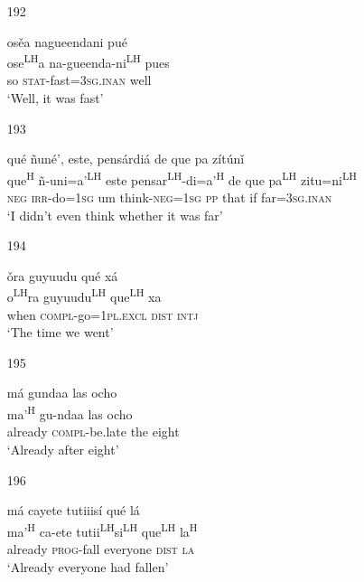 \begin{itemize}
\item[192]
 
\glll   os\v{e}a nagueendani pu\'{e} \\
ose\textsuperscript{LH}a na-gueenda-ni\textsuperscript{LH} pues\\
so \textsc{stat}-fast=\textsc{3sg.inan} well\\
\glt `Well, it was fast'
 


\item[193]
 
\glll   qu\'{e} \~{n}un\'{e}', este, pens\'{a}rdi\'{a} de que pa z\'{i}t\'{u}n\v{i}\\
que\textsuperscript{H} \~{n}-uni=a'\textsuperscript{LH} este pensar\textsuperscript{LH}-di=a'\textsuperscript{H} de que pa\textsuperscript{LH} zitu=ni\textsuperscript{LH}\\
\textsc{neg} \textsc{irr}-do=\textsc{1sg} um think-\textsc{neg}=\textsc{1sg} \textsc{pp} that if far=\textsc{3sg.inan}\\
\glt `I didn't even think whether it was far'
 


\item[194]
 
\glll   \v{o}ra guyuudu qu\'{e} x\'{a} \\
   o\textsuperscript{LH}ra guyuudu\textsuperscript{LH} que\textsuperscript{LH} xa\\
when \textsc{compl}-go=\textsc{1pl.excl} \textsc{dist} \textsc{intj}\\
\glt `The time we went'
 


\item[195]
 
\glll   m\'{a} gundaa las ocho \\
  ma'\textsuperscript{H} gu-ndaa las ocho\\
already \textsc{compl}-be.late the eight\\
\glt `Already after eight'
 


\item[196]
 
\glll   m\'{a} cayete tutiiis\'{i} qu\'{e} l\'{a} \\
ma'\textsuperscript{H} ca-ete tutii\textsuperscript{LH}si\textsuperscript{LH} que\textsuperscript{LH} la\textsuperscript{H}\\
already \textsc{prog}-fall everyone \textsc{dist} \textsc{la}\\
\glt `Already everyone had fallen'
 



\end{itemize}
